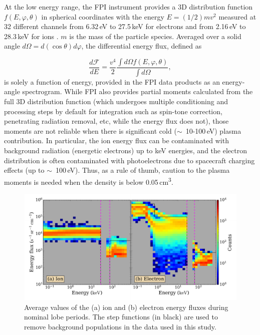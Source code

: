\documentclass[draft]{agujournal2019}
\begin{document}
At the low energy range, the FPI instrument provides a 3D distribution function $f(E, \varphi, \theta)$ in spherical coordinates with the energy $E=(1/2)mv^2$ measured at 32 different channels from 6.32\,\si{eV} to 27.5\,\si{keV} for electrons and from 2.16\,\si{eV} to 28.3\,\si{keV} for ions \cite{Pollock2016}. $m$ is the mass of the particle species. Averaged over a solid angle $d\Omega=d(\cos\theta)d\varphi$, the differential energy flux, defined as \cite{Larsen2022}

\begin{equation}\label{eq:ef}
    \frac{d\mathcal{F}}{dE}=\frac{v^4}{2}\frac{\int d\Omega f(E,\varphi,\theta)}{\int d\Omega},
\end{equation}
is solely a function of energy, provided in the FPI data products as an energy-angle spectrogram. While FPI also provides partial moments calculated from the full 3D distribution function (which undergoes multiple conditioning and processing steps by default for integration such as spin-tone correction, penetrating radiation removal, etc, while the energy flux does not), those moments are not reliable when there is significant cold (\mbox{$\sim$ 10-100\,\si{eV}}) plasma contribution. In particular, the ion energy flux can be contaminated with background radiation (energetic electrons) up to keV energies, and the electron distribution is often contaminated with photoelectrons due to spacecraft charging effects (up to \mbox{$\sim$ 100\,\si{eV}}). Thus, as a rule of thumb, caution to the plasma moments is needed when the density is below \mbox{0.05\,\si{cm\tothe{3}}}.

\begin{figure}
\centering
\noindent\includegraphics[width=\textwidth]{2023JA031358R-fa1.pdf}
\caption{
Average values of the (a) ion and (b) electron energy fluxes during nominal lobe periods. The step functions (in black) are used to remove background populations in the data used in this study.
}
\label{fig:fbg_hist}
\end{figure}
\end{document}
